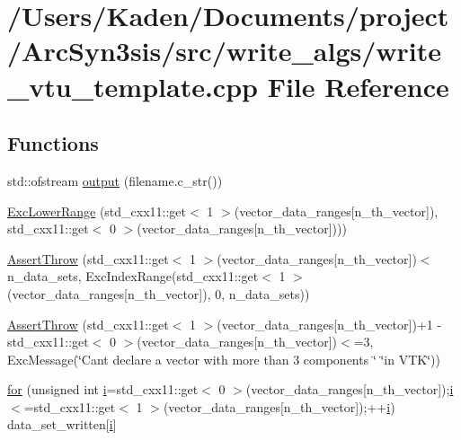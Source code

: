 \hypertarget{a00623}{}\section{/\+Users/\+Kaden/\+Documents/project/\+Arc\+Syn3sis/src/write\+\_\+algs/write\+\_\+vtu\+\_\+template.cpp File Reference}
\label{a00623}
\subsection*{Functions}
\begin{DoxyCompactItemize}
\item 
std\+::ofstream \hyperlink{a00623_a934120182a1459d17613528940e2bc61}{output} (filename.\+c\+\_\+str())
\item 
\hyperlink{a00623_a4271ce0c289249580f95635786f05419}{Exc\+Lower\+Range} (std\+\_\+cxx11\+::get$<$ 1 $>$(vector\+\_\+data\+\_\+ranges\mbox{[}n\+\_\+th\+\_\+vector\mbox{]}), std\+\_\+cxx11\+::get$<$ 0 $>$(vector\+\_\+data\+\_\+ranges\mbox{[}n\+\_\+th\+\_\+vector\mbox{]})))
\item 
\hyperlink{a00623_a2b1bf74c066621ba811fd8bc87bc0dba}{Assert\+Throw} (std\+\_\+cxx11\+::get$<$ 1 $>$(vector\+\_\+data\+\_\+ranges\mbox{[}n\+\_\+th\+\_\+vector\mbox{]})$<$ n\+\_\+data\+\_\+sets, Exc\+Index\+Range(std\+\_\+cxx11\+::get$<$ 1 $>$(vector\+\_\+data\+\_\+ranges\mbox{[}n\+\_\+th\+\_\+vector\mbox{]}), 0, n\+\_\+data\+\_\+sets))
\item 
\hyperlink{a00623_a2641c21aa7765f6d1dff5c8b213e99dc}{Assert\+Throw} (std\+\_\+cxx11\+::get$<$ 1 $>$(vector\+\_\+data\+\_\+ranges\mbox{[}n\+\_\+th\+\_\+vector\mbox{]})+1 -\/ std\+\_\+cxx11\+::get$<$ 0 $>$(vector\+\_\+data\+\_\+ranges\mbox{[}n\+\_\+th\+\_\+vector\mbox{]})$<$=3, Exc\+Message(\char`\"{}Can\textquotesingle{}t declare a vector with more than 3 components \char`\"{} \char`\"{}in V\+TK\char`\"{}))
\item 
\hyperlink{a00623_ad1e7380d51df1e0043d24d3c8a860e0a}{for} (unsigned int \hyperlink{a00608_afb6aca53df96564f2adf086c942453ec}{i}=std\+\_\+cxx11\+::get$<$ 0 $>$(vector\+\_\+data\+\_\+ranges\mbox{[}n\+\_\+th\+\_\+vector\mbox{]});\hyperlink{a00608_afb6aca53df96564f2adf086c942453ec}{i}$<$=std\+\_\+cxx11\+::get$<$ 1 $>$(vector\+\_\+data\+\_\+ranges\mbox{[}n\+\_\+th\+\_\+vector\mbox{]});++\hyperlink{a00608_afb6aca53df96564f2adf086c942453ec}{i}) data\+\_\+set\+\_\+written\mbox{[}\hyperlink{a00608_afb6aca53df96564f2adf086c942453ec}{i}\mbox{]}
\end{DoxyCompactItemize}
